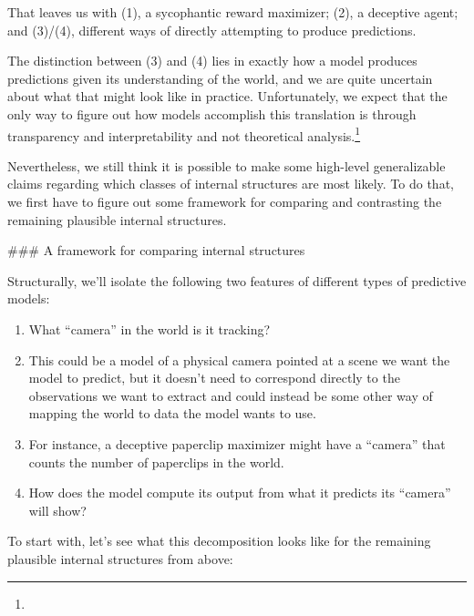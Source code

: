 {That leaves us with (1), a sycophantic\cite{TODO: cite https://www.cold-takes.com/why-ai-alignment-could-be-hard-with-modern-deep-learning/} reward maximizer; (2), a deceptive agent; and (3)/(4), different ways of directly attempting to produce predictions.

The distinction between (3) and (4) lies in exactly how a model produces predictions given its understanding of the world, and we are quite uncertain about what that might look like in practice. Unfortunately, we expect that the only way to figure out how models accomplish this translation is through transparency and interpretability and not theoretical analysis.\footnote{}

Nevertheless, we still think it is possible to make some high-level generalizable claims regarding which classes of internal structures are most likely. To do that, we first have to figure out some framework for comparing and contrasting the remaining plausible internal structures.


### A framework for comparing internal structures

Structurally, we'll isolate the following two features of different types of predictive models:



\begin{enumerate}
\item What ``camera'' in the world is it tracking?
\item This could be a model of a physical camera pointed at a scene we want the model to predict, but it doesn't need to correspond directly to the observations we want to extract and could instead be some other way of mapping the world to data the model wants to use.
\item For instance, a deceptive paperclip maximizer might have a ``camera'' that counts the number of paperclips in the world.
\item How does the model compute its output from what it predicts its ``camera'' will show?
\end{enumerate}

To start with, let's see what this decomposition looks like for the remaining plausible internal structures from above:



}
